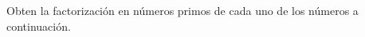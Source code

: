 \question[20] Obten la factorización en n\'umeros primos de cada uno de los n\'umeros a continuaci\'on.
\begin{multicols}{2}

    \begin{parts}
        {\printanswers
            
        }
        
        
        
        
        
        
        
        
        
    \end{parts}
\end{multicols}
